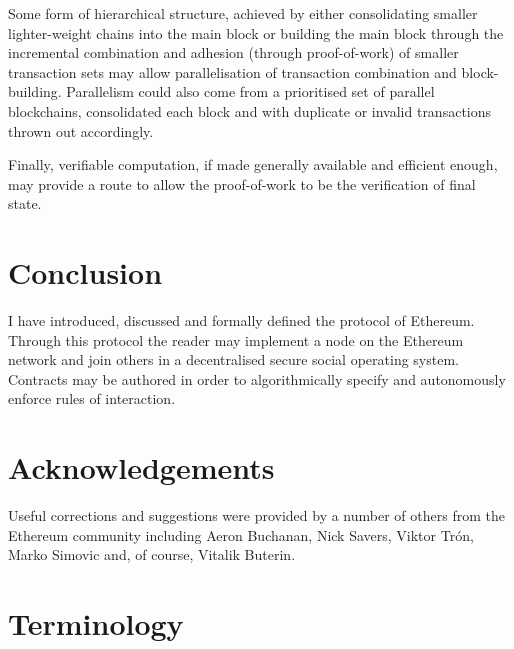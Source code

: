\documentclass[9pt,oneside]{amsart}
\begin{document}
\begin{multicols}{2}
Some form of hierarchical structure, achieved by either consolidating smaller lighter-weight chains into the main block or building the main block through the incremental combination and adhesion (through proof-of-work) of smaller transaction sets may allow parallelisation of transaction combination and block-building. Parallelism could also come from a prioritised set of parallel blockchains, consolidated each block and with duplicate or invalid transactions thrown out accordingly.

Finally, verifiable computation, if made generally available and efficient enough, may provide a route to allow the proof-of-work to be the verification of final state.

\section{Conclusion} \label{ch:conclusion}

I have introduced, discussed and formally defined the protocol of Ethereum. Through this protocol the reader may implement a node on the Ethereum network and join others in a decentralised secure social operating system. Contracts may be authored in order to algorithmically specify and autonomously enforce rules of interaction.

\section{Acknowledgements}

Useful corrections and suggestions were provided by a number of others from the Ethereum community including Aeron Buchanan, Nick Savers, Viktor Tr\'{o}n, Marko Simovic and, of course, Vitalik Buterin.




\end{multicols}

\appendix

\section{Terminology}
\end{document}
